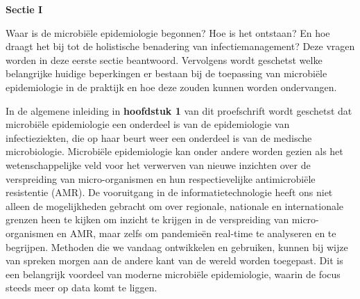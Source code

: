 \documentclass[
]{book}
\begin{document}
\textbf{Sectie I}

Waar is de microbiële epidemiologie begonnen? Hoe is het ontstaan? En hoe draagt het bij tot de holistische benadering van infectiemanagement? Deze vragen worden in deze eerste sectie beantwoord. Vervolgens wordt geschetst welke belangrijke huidige beperkingen er bestaan bij de toepassing van microbiële epidemiologie in de praktijk en hoe deze zouden kunnen worden ondervangen.

In de algemene inleiding in \textbf{hoofdstuk 1} van dit proefschrift wordt geschetst dat microbiële epidemiologie een onderdeel is van de epidemiologie van infectieziekten, die op haar beurt weer een onderdeel is van de medische microbiologie. Microbiële epidemiologie kan onder andere worden gezien als het wetenschappelijke veld voor het verwerven van nieuwe inzichten over de verspreiding van micro-organismen en hun respectievelijke antimicrobiële resistentie (AMR). De vooruitgang in de informatietechnologie heeft ons niet alleen de mogelijkheden gebracht om over regionale, nationale en internationale grenzen heen te kijken om inzicht te krijgen in de verspreiding van micro-organismen en AMR, maar zelfs om pandemieën real-time te analyseren en te begrijpen. Methoden die we vandaag ontwikkelen en gebruiken, kunnen bij wijze van spreken morgen aan de andere kant van de wereld worden toegepast. Dit is een belangrijk voordeel van moderne microbiële epidemiologie, waarin de focus steeds meer op data komt te liggen.
\end{document}
